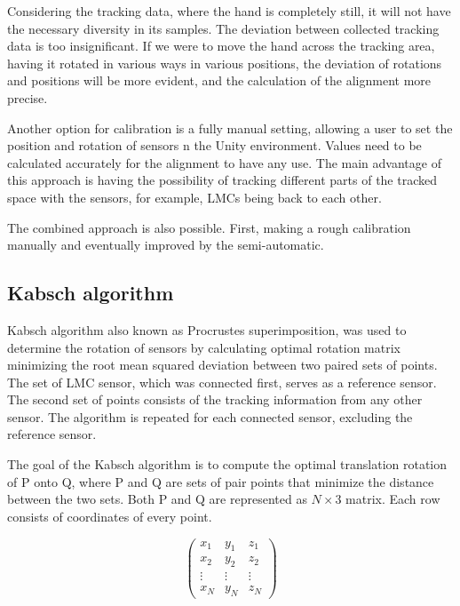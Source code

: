 Considering the tracking data, where the hand is completely still, it will not have the necessary diversity in its samples. The deviation between collected tracking data is too insignificant. If we were to move the hand across the tracking area, having it rotated in various ways in various positions, the deviation of rotations and positions will be more evident, and the calculation of the alignment more precise. \cite{tomasMultileap}

Another option for calibration is a fully manual setting, allowing a user to set the position and rotation of sensors n the Unity environment. Values need to be calculated accurately for the alignment to have any use. The main advantage of this approach is having the possibility of tracking different parts of the tracked space with the sensors, for example, LMCs being back to each other. \cite{tomasMultileap}

The combined approach is also possible. First, making a rough calibration manually and eventually improved by the semi-automatic.

\subsection{Kabsch algorithm}

Kabsch algorithm \cite{kabsch} also known as Procrustes superimposition, was used to determine the rotation of sensors by calculating optimal rotation matrix minimizing the root mean squared deviation between two paired sets of points. The set of LMC sensor, which was connected first, serves as a reference sensor. The second set of points consists of the tracking information from any other sensor. The algorithm is repeated for each connected sensor, excluding the reference sensor. \cite{tomasMultileap}

The goal of the Kabsch algorithm is to compute the optimal translation rotation of P onto Q, where P and Q are sets of pair points that minimize the distance between the two sets. Both P and Q are represented as $N \times 3$ matrix. Each row consists of coordinates of every point. \cite{tomasMultileap}

\begin{equation}
    \begin{pmatrix}
        x_1 & y_1 & z_1\\
        x_2 & y_2 & z_2\\
        \vdots & \vdots & \vdots\\
        x_N & y_N & z_N
    \end{pmatrix}
\end{equation}

